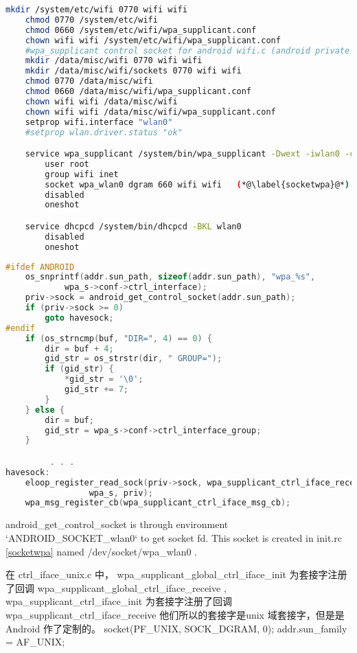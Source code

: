 \documentclass[a4paper,11pt,]{article}%
\begin{document}
\begin{lstlisting}[language=bash, caption=init.rc]
    mkdir /system/etc/wifi 0770 wifi wifi
    chmod 0770 /system/etc/wifi
    chmod 0660 /system/etc/wifi/wpa_supplicant.conf
    chown wifi wifi /system/etc/wifi/wpa_supplicant.conf
    #wpa_supplicant control socket for android wifi.c (android private socket)
    mkdir /data/misc/wifi 0770 wifi wifi
    mkdir /data/misc/wifi/sockets 0770 wifi wifi
    chmod 0770 /data/misc/wifi
    chmod 0660 /data/misc/wifi/wpa_supplicant.conf
    chown wifi wifi /data/misc/wifi
    chown wifi wifi /data/misc/wifi/wpa_supplicant.conf
    setprop wifi.interface "wlan0"
    #setprop wlan.driver.status "ok"

    service wpa_supplicant /system/bin/wpa_supplicant -Dwext -iwlan0 -c/data/misc/wifi/wpa_supplicant.conf -dd
        user root
        group wifi inet 
        socket wpa_wlan0 dgram 660 wifi wifi   (*@\label{socketwpa}@*) 
        disabled
        oneshot

    service dhcpcd /system/bin/dhcpcd -BKL wlan0
        disabled
        oneshot 
\end{lstlisting}

\begin{lstlisting}[language=C,caption=wpa_supplicant_ctrl_iface_init]
#ifdef ANDROID
	os_snprintf(addr.sun_path, sizeof(addr.sun_path), "wpa_%s",
			wpa_s->conf->ctrl_interface);
	priv->sock = android_get_control_socket(addr.sun_path);
	if (priv->sock >= 0)
		goto havesock;
#endif
	if (os_strncmp(buf, "DIR=", 4) == 0) {
		dir = buf + 4;
		gid_str = os_strstr(dir, " GROUP=");
		if (gid_str) {
			*gid_str = '\0';
			gid_str += 7;
		}
	} else {
		dir = buf;
		gid_str = wpa_s->conf->ctrl_interface_group;
	}

         . . .
havesock:
	eloop_register_read_sock(priv->sock, wpa_supplicant_ctrl_iface_receive,
				 wpa_s, priv);
	wpa_msg_register_cb(wpa_supplicant_ctrl_iface_msg_cb);

\end{lstlisting}
android_get_control_socket is through environment `ANDROID_SOCKET_wlan0` to
get socket fd. This socket is created in init.rc \autoref{socketwpa} named  /dev/socket/wpa_wlan0
.

 在 ctrl_iface_unix.c 中，
wpa_supplicant_global_ctrl_iface_init 为套接字注册了回调  wpa_supplicant_global_ctrl_iface_receive
,  wpa_supplicant_ctrl_iface_init 为套接字注册了回调 wpa_supplicant_ctrl_iface_receive
他们所以的套接字是unix 域套接字，但是是 Android 作了定制的。
socket(PF_UNIX, SOCK_DGRAM, 0);
addr.sun_family = AF_UNIX;
\end{document}
